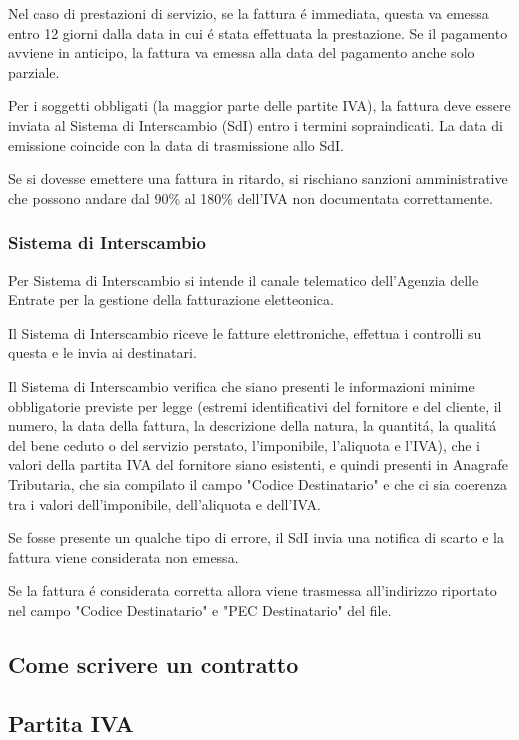 \documentclass{article}
\begin{document}
Nel caso di prestazioni di servizio, se la fattura \'e immediata, questa va emessa entro 12 giorni dalla data in cui \'e stata effettuata la prestazione.
Se il pagamento avviene in anticipo, la fattura va emessa alla data del pagamento anche solo parziale. 

Per i soggetti obbligati (la maggior parte delle partite IVA), la fattura deve essere inviata al Sistema di Interscambio (SdI) entro i termini sopraindicati. La data di emissione coincide con la data di trasmissione allo SdI.

Se si dovesse emettere una fattura in ritardo, si rischiano sanzioni amministrative che possono andare dal 90\% al 180\% dell'IVA non documentata correttamente. 

\subsubsection{Sistema di Interscambio}
Per Sistema di Interscambio si intende il canale telematico dell'Agenzia delle Entrate per la gestione della fatturazione eletteonica.

Il Sistema di Interscambio riceve le fatture elettroniche, effettua i controlli su questa e le invia ai destinatari. 

Il Sistema di Interscambio verifica che siano presenti le informazioni minime obbligatorie previste per legge 
(estremi identificativi del fornitore e del cliente, il numero, la data della fattura, la descrizione della natura, la quantit\'a, la qualit\'a del bene ceduto o del servizio perstato, l'imponibile, l'aliquota e l'IVA),
che i valori della partita IVA del fornitore siano esistenti, e quindi presenti in Anagrafe Tributaria, che sia compilato il campo "Codice Destinatario" e che ci sia coerenza tra i valori dell'imponibile, dell'aliquota e dell'IVA.

Se fosse presente un qualche tipo di errore, il SdI invia una notifica di scarto e la fattura viene considerata non emessa. 

Se la fattura \'e considerata corretta allora viene trasmessa all'indirizzo riportato nel campo "Codice Destinatario" e "PEC Destinatario" del file.

\subsection{Come scrivere un contratto}
\subsection{Partita IVA}
\end{document}
